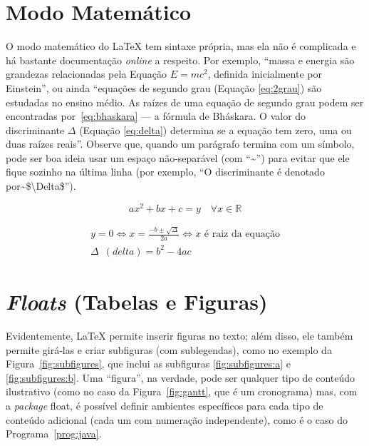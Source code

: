\section{Modo Matemático}

O modo matemático do \LaTeX{} tem sintaxe própria, mas ela não é complicada e
há bastante documentação \emph{online} a respeito. Por exemplo, ``massa e
energia são grandezas relacionadas pela Equação $E=mc^2$, definida inicialmente
por Einstein'', ou ainda ``equações de segundo grau (Equação \ref{eq:2grau})
são estudadas no ensino médio. As raízes de uma equação de segundo grau podem
ser encontradas por~\eqref{eq:bhaskara} --- a fórmula de Bháskara.
O valor do discriminante $\Delta$ (Equação \ref{eq:delta}) determina se a
equação tem zero, uma ou duas raízes reais''. Observe que, quando um
parágrafo termina com um símbolo, pode ser boa ideia usar um espaço
não-separável (com ``\textsf{\textasciitilde}'') para evitar que ele
fique sozinho na última linha (por exemplo, ``\textsf{O discriminante é
denotado por\textasciitilde{}\$\textbackslash{}Delta\$}'').\label{orphanchar}

\begin{equation}
  \label{eq:2grau}
  ax^2+bx+c=y \quad \forall x \in \mathbb{R}
\end{equation}

\begin{gather}
\label{eq:bhaskara}
    y=0 \Leftrightarrow x=\frac{-b \pm \sqrt{\Delta}}{2a}
    \Leftrightarrow x \text{ é raiz da equação}\\
\label{eq:delta}
    \Delta\enspace(\mathit{delta}) = b^2-4ac
\end{gather}

\section{\emph{Floats} (Tabelas e Figuras)}

Evidentemente, \LaTeX{} permite inserir figuras no texto; além
disso, ele também permite girá-las e criar subfiguras
(com sublegendas), como no exemplo da
Figura~\ref{fig:subfigures}, que inclui as
subfiguras \ref{fig:subfigures:a} e \ref{fig:subfigures:b}.
Uma ``figura'', na verdade, pode ser qualquer tipo de conteúdo
ilustrativo (como no caso da Figura~\ref{fig:gantt}, que é
um cronograma) mas, com a \textit{package} \textsf{float}, é
possível definir ambientes específicos para cada tipo de
conteúdo adicional (cada um com numeração independente), como
é o caso do Programa~\ref{prog:java}.

